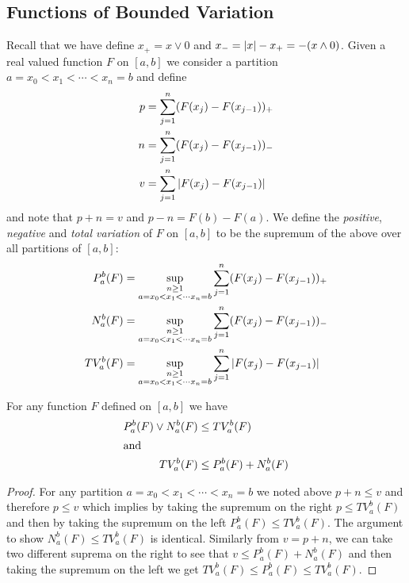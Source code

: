 \subsection{Functions of Bounded Variation}
Recall that we have define $x_+ = x \vee 0$ and $x_- = \left \vert x \right \vert -
x_+ = -(x \wedge 0)$.  Given a real valued function $F$ on $[a,b]$ we consider a partition $a=x_0
< x_1 < \dotsb < x_n=b$ and define 
\begin{align*}
p &= \sum_{j=1}^n (F(x_j) - F(x_{j-1}))_+ \\
n &= \sum_{j=1}^n (F(x_j) - F(x_{j-1}))_- \\
v &= \sum_{j=1}^n \left \vert F(x_j) - F(x_{j-1}) \right \vert\\
\end{align*}
and note that $p+n = v$ and $p - n = F(b) - F(a)$.  We define the
\emph{positive}, \emph{negative} and \emph{total variation} of $F$ on
$[a,b]$ to be the supremum of the above over all partitions of
$[a,b]$:
\begin{align*}
P_a^b(F) &= \sup_{\substack{n \geq 1 \\ a=x_0 < x_1 < \dotsb x_n=b}} \sum_{j=1}^n (F(x_j) - F(x_{j-1}))_+ \\
N_a^b(F) &= \sup_{\substack{n \geq 1 \\ a=x_0 < x_1 < \dotsb x_n=b}} \sum_{j=1}^n (F(x_j) - F(x_{j-1}))_- \\
TV_a^b(F) &= \sup_{\substack{n \geq 1 \\ a=x_0 < x_1 < \dotsb x_n=b}} \sum_{j=1}^n \left \vert F(x_j) - F(x_{j-1}) \right \vert\\
\end{align*}


\begin{lem}\label{ElementaryVariationInequalities}For any function $F$ defined on $[a,b]$ we have 
\begin{align*}
P_a^b(F) \vee N_a^b(F) &\leq TV_a^b(F) \\
\intertext{and}
TV_a^b(F) &\leq P_a^b(F) + N_a^b(F)
\end{align*}
\end{lem}
\begin{proof}
For any partition $a=x_0 < x_1 < \dotsb < x_n=b$ we noted above $p + n
\leq v$ and therefore $p \leq v$ which implies by taking the supremum on
the right $p \leq TV_a^b(F)$ and then by taking the supremum on the
left $P_a^b(F) \leq TV_a^b(F)$.  The argument to show $N_a^b(F) \leq
TV_a^b(F)$ is identical.  Similarly from $v = p + n$, we can take two
different suprema on the right to see that $v \leq P_a^b(F) +
N_a^b(F)$ and then taking the supremum on the left we get $TV_a^b(F)
\leq P_a^b(F) \leq TV_a^b(F)$.
\end{proof}

